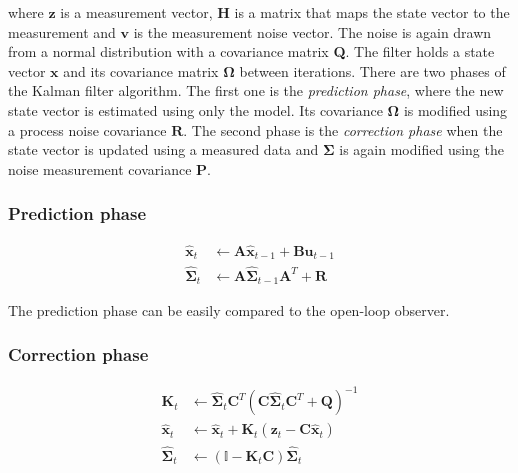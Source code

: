 where $\textbf{z}$ is a measurement vector, \textbf{H} is a matrix that maps the state vector to the measurement and $\textbf{v}$ is the measurement noise vector. The noise is again drawn from a normal distribution with a covariance matrix \textbf{Q}. The filter holds a state vector $\textbf{\^x}$ and its covariance matrix $\boldsymbol{\Omega}$ between iterations. There are two phases of the Kalman filter algorithm. The first one is the \textit{prediction phase}, where the new state vector is estimated using only the model. Its covariance $\boldsymbol{\Omega}$ is modified using a process noise covariance $\textbf{R}$. The second phase is the \textit{correction phase} when the state vector is updated using a measured data and $\boldsymbol{\Sigma}$ is again modified using the noise measurement covariance \textbf{P}.      

\subsubsection*{Prediction phase}

\begin{equation}
\begin{split}
\hat{\textbf{x}}_t &\leftarrow \textbf{A}\hat{\textbf{x}}_{t-1} + \textbf{B}\textbf{u}_{t-1} \\
\hat{\boldsymbol{\Sigma}}_t &\leftarrow \textbf{A}\hat{\boldsymbol{\Sigma}}_{t-1}\textbf{A}^{T} + \textbf{R}
\end{split}
\end{equation}

The prediction phase can be easily compared to the open-loop observer. 

\subsubsection*{Correction phase}

\begin{equation}
\begin{split}
\textbf{K}_t &\leftarrow \hat{\boldsymbol{\Sigma}}_t\textbf{C}^{T}\left(\textbf{C}\hat{\boldsymbol{\Sigma}}_t\textbf{C}^{T} + \textbf{Q}\right)^{-1} \\
\hat{\textbf{x}}_t &\leftarrow \hat{\textbf{x}}_t + \textbf{K}_t\left(\textbf{z}_t - \textbf{C}\hat{\textbf{x}}_t\right) \\
\hat{\boldsymbol{\Sigma}}_t &\leftarrow \left(\mathbb{I} - \textbf{K}_t\textbf{C}\right)\hat{\boldsymbol{\Sigma}}_t
\end{split}
\end{equation}

